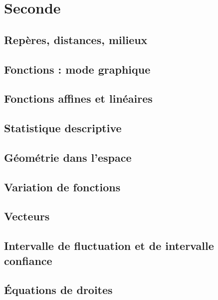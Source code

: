 \documentclass[a4paper,12pt]{book}
\begin{document}
\part{Seconde}


\chapter{Repères, distances, milieux}


\chapter{Fonctions : mode graphique}


\chapter{Fonctions affines et linéaires}


\chapter{Statistique descriptive}


\chapter{Géométrie dans l'espace}


\chapter{Variation de fonctions}

\chapter{Vecteurs}


\chapter{Intervalle de fluctuation et de intervalle confiance}


\chapter{Équations de droites}

\end{document}
